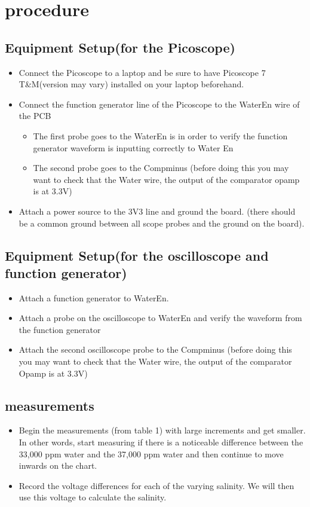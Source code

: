 \documentclass[twocolumn]{report}
\begin{document}
\section{procedure}
\subsection{Equipment Setup(for the Picoscope)}
\begin{itemize}
    \item Connect the Picoscope to a laptop and be sure to have Picoscope 7 T&M(version may vary) installed on your laptop beforehand.
    \item Connect the function generator line of the Picoscope to the WaterEn wire of the PCB
    \begin{itemize}
        \item The first probe goes to the WaterEn is in order to verify the function generator waveform is inputting correctly to Water En
        \item The second probe goes to the Compminus (before doing this you may want to check that the Water wire, the output of the comparator opamp is at 3.3V)
    \end{itemize}
    \item Attach a power source to the 3V3 line and ground the board. (there should be a common ground between all scope probes and the ground on the board).
\end{itemize}

\subsection{Equipment Setup(for the oscilloscope and function generator)}
\begin{itemize}
    \item Attach a function generator to WaterEn.
    \item Attach a probe on the oscilloscope to WaterEn and verify the waveform from the function generator
    \item Attach the second oscilloscope probe to the Compminus (before doing this you may want to check that the Water wire, the output of the comparator Opamp is at 3.3V)
\end{itemize}

\subsection{measurements}
\begin{itemize}
    \item Begin the measurements (from table 1) with large increments and get smaller. In other words, start measuring if there is a noticeable difference between the 33,000 ppm water and the 37,000 ppm water and then continue to move inwards on the chart. 
    \item Record the voltage differences for each of the varying salinity. We will then use this voltage to calculate the salinity. 
\end{itemize}
\end{document}
